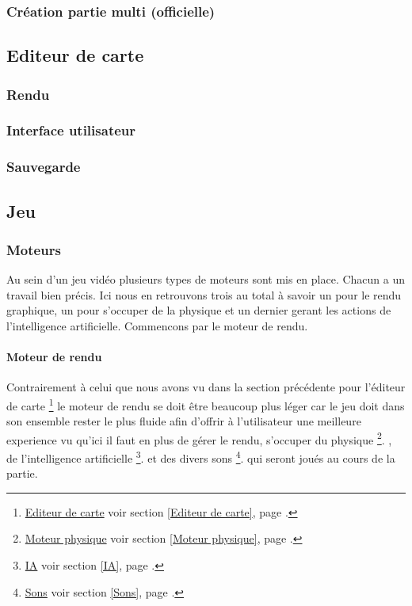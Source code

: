 	\subsubsection{Création partie multi (officielle)}
			

\subsection{Editeur de carte}

	\hypertarget{Editeur de carte}{}
	\label{Editeur de carte}

	\subsubsection{Rendu}
		\subsubsection{Interface utilisateur}
		\subsubsection{Sauvegarde}


\subsection{Jeu}

	\subsubsection{Moteurs}
	
		Au sein d'un jeu vidéo plusieurs types de moteurs sont mis en place.
		Chacun a un travail bien précis.
		Ici nous en retrouvons trois au total à savoir un pour le rendu graphique, un
		pour s'occuper de la physique et un dernier gerant les actions de
		l'intelligence artificielle.
		Commencons par le moteur de rendu.
	
		\paragraph{Moteur de rendu\\}
		
			\hypertarget{Moteur de rendu}{}
			\label{Moteur de rendu}
		
			Contrairement à celui que nous avons vu dans la section précédente pour
			l'éditeur de carte
			\footnote{
				\hyperlink{Editeur de carte}{Editeur de carte}
				\og voir section \ref{Editeur de carte}, page \pageref{Editeur de carte}.\fg
			}
			le moteur de rendu se doit être beaucoup plus léger car le jeu doit dans son
			ensemble rester le plus fluide afin d'offrir à l'utilisateur une meilleure
			experience vu qu'ici il faut en plus de gérer le rendu, s'occuper du
			physique
			\footnote{
				\hyperlink{Moteur physique}{Moteur physique}
				\og voir section \ref{Moteur physique}, page \pageref{Moteur physique}.\fg
			}.
			, de l'intelligence artificielle
			\footnote{
				\hyperlink{IA}{IA}
				\og voir section \ref{IA}, page \pageref{IA}.\fg
			}.
			et des divers sons
			\footnote{
				\hyperlink{Sons}{Sons}
				\og voir section \ref{Sons}, page \pageref{Sons}.\fg
			}.
			qui seront joués au cours de la partie.		
			
